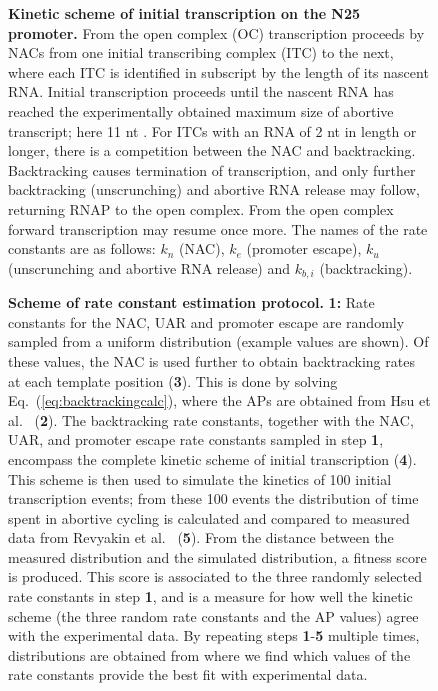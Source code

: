 \begin{figure}[h]
  \caption{{\bf Kinetic scheme of initial transcription on the N25 promoter.}
    From the open complex (OC) transcription proceeds by NACs from one initial
    transcribing complex (ITC) to the next, where each ITC is identified in
    subscript by the length of its nascent RNA. Initial transcription proceeds
    until the nascent RNA has reached the experimentally obtained maximum size
    of abortive transcript; here 11 nt \cite{hsu_initial_2006}. For ITCs with
    an RNA of 2 nt in length or longer, there is a competition between the
    NAC and backtracking. Backtracking causes termination of transcription,
    and only further backtracking (unscrunching) and abortive RNA release may
    follow, returning RNAP to the open complex. From the open complex forward
    transcription may resume once more. The names of the rate constants are as
    follows: $k_n$ (NAC), $k_e$ (promoter escape), $k_u$ (unscrunching and
    abortive RNA release) and $k_{b,i}$ (backtracking).}
    \label{fig:model_and_rates}
\end{figure}

\begin{figure}[h]
  \caption{ {\bf Scheme of rate constant estimation protocol.} \textbf{1:}
    Rate constants for the NAC, UAR and promoter escape are randomly sampled
    from a uniform distribution (example values are shown). Of these values,
    the NAC is used further to obtain backtracking rates at each template
    position (\textbf{3}). This is done by solving
    Eq.~(\ref{eq:backtrackingcalc}), where the APs are obtained from Hsu et
    al.\ \cite{hsu_initial_2006} (\textbf{2}). The backtracking rate
    constants, together with the NAC, UAR, and promoter escape rate constants
    sampled in step \textbf{1}, encompass the complete kinetic scheme of
    initial transcription (\textbf{4}). This scheme is then used to simulate
    the kinetics of 100 initial transcription events; from these 100 events
    the distribution of time spent in abortive cycling is calculated and
    compared to measured data from Revyakin et al.\
    \cite{revyakin_abortive_2006} (\textbf{5}). From the distance between the
    measured distribution and the simulated distribution, a fitness score is
    produced. This score is associated to the three randomly selected rate
    constants in step \textbf{1}, and is a measure for how well the kinetic
    scheme (the three random rate constants and the AP values) agree with the
    experimental data. By repeating steps \textbf{1}-\textbf{5} multiple
    times, distributions are obtained from where we find which values of the
    rate constants provide the best fit with experimental data.}
    \label{fig:param_estimation_scheme}
\end{figure}

